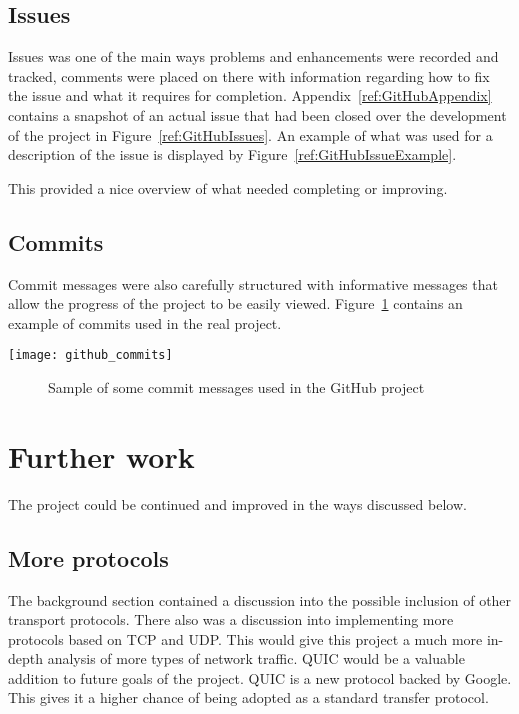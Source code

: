\subsection{Issues}
Issues was one of the main ways problems and enhancements were recorded and tracked, comments were placed on there with information regarding how to fix the issue and what it requires for completion. Appendix~\ref{ref:GitHubAppendix} contains a snapshot of an actual issue that had been closed over the development of the project in Figure~\ref{ref:GitHubIssues}. An example of what was used for a description of the issue is displayed by Figure~\ref{ref:GitHubIssueExample}.

This provided a nice overview of what needed completing or improving.

\subsection{Commits}
Commit messages were also carefully structured with informative messages that allow the progress of the project to be easily viewed. Figure~\ref{ref:githubCommits} contains an example of commits used in the real project.

\begin{center}
	\texttt{[image: github\_commits]}
	\begin{figure}[h]
		\caption{Sample of some commit messages used in the GitHub project}
		\label{ref:githubCommits}
	\end{figure}
\end{center}

\section{Further work}
The project could be continued and improved in the ways discussed below.

\subsection{More protocols}
The background section contained a discussion into the possible inclusion of other transport protocols. There also was a discussion into implementing more protocols based on TCP and UDP. This would give this project a much more in-depth analysis of more types of network traffic. QUIC would be a valuable addition to future goals of the project. QUIC is a new protocol backed by Google. This gives it a higher chance of being adopted as a standard transfer protocol.

